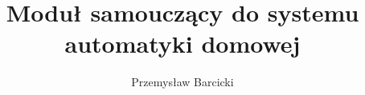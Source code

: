 \documentclass[inzynier,druk]{dyplom}
\author{Przemysław Barcicki}
\title{Moduł samouczący do systemu automatyki domowej}
\begin{document}
\maketitle



\tableofcontents











\listoffigures
\listoflistings
\listoftables

\appendixpage
\appendix

\end{document}
